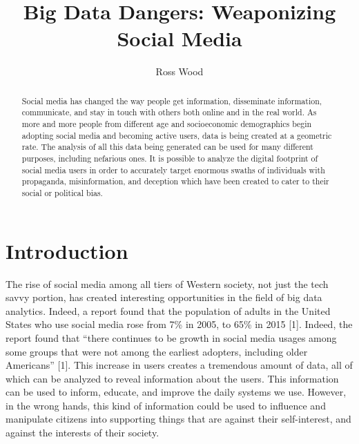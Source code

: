 \documentclass[sigconf]{acmart}
\begin{document}
\title{Big Data Dangers: Weaponizing Social Media}



\author{Ross Wood}

\renewcommand{\shortauthors}{B. Trovato et al.}


\begin{abstract}
Social media has changed the way people get information, disseminate information, communicate, and stay in touch with others both online and in the real world. As more and more people from different age and socioeconomic demographics begin adopting social media and becoming active users, data is being created at a geometric rate. The analysis of all this data being generated can be used for many different purposes, including nefarious ones. It is possible to analyze the digital footprint of social media users in order to accurately target enormous swaths of individuals with propaganda, misinformation, and deception which have been created to cater to their social or political bias.
\end{abstract}



\maketitle

\section{Introduction}

The rise of social media among all tiers of Western society, not just the tech savvy portion, has created interesting opportunities in the field of big data analytics. Indeed, a report found that the population of adults in the United States who use social media rose from 7\% in 2005, to 65\% in 2015 [1]. Indeed, the report found that ``there continues to be growth in social media usages among some groups that were not among the earliest adopters, including older Americans'' [1]. This increase in users creates a tremendous amount of data, all of which can be analyzed to reveal information about the users. This information can be used to inform, educate, and improve the daily systems we use. However, in the wrong hands, this kind of information could be used to influence and manipulate citizens into supporting things that are against their self-interest, and against the interests of their society. 
\end{document}
